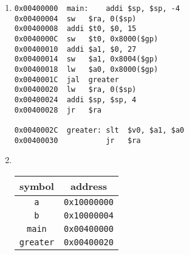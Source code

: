 \documentclass[12pt]{article}
\begin{document}
\begin{enumerate}
\item
\begin{verbatim}
0x00400000  main:    addi $sp, $sp, -4
0x00400004  sw   $ra, 0($sp)
0x00400008  addi $t0, $0, 15
0x0040000C  sw   $t0, 0x8000($gp)
0x00400010  addi $a1, $0, 27
0x00400014  sw   $a1, 0x8004($gp)
0x00400018  lw   $a0, 0x8000($gp)
0x0040001C  jal  greater
0x00400020  lw   $ra, 0($sp)
0x00400024  addi $sp, $sp, 4
0x00400028  jr   $ra

0x0040002C  greater: slt  $v0, $a1, $a0
0x00400030           jr   $ra
\end{verbatim}

\item ~
\begin{table}[h!]
\centering
\begin{tabular}{|c|c|}
\hline
symbol & address \\
\hline
\texttt{a} & \texttt{0x10000000} \\
\hline
\texttt{b} & \texttt{0x10000004} \\
\hline
\texttt{main} & \texttt{0x00400000} \\
\hline
\texttt{greater} & \texttt{0x00400020} \\
\hline
\end{tabular}
\end{table}

\newpage


\end{enumerate}
\end{document}
